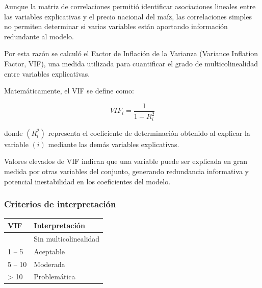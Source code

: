 \documentclass[11pt]{article}
\begin{document}
Aunque la matriz de correlaciones permitió identificar asociaciones
lineales entre las variables explicativas y el precio nacional del maíz,
las correlaciones simples no permiten determinar si varias variables
están aportando información redundante al modelo.

Por esta razón se calculó el Factor de Inflación de la Varianza
(Variance Inflation Factor, VIF), una medida utilizada para cuantificar
el grado de multicolinealidad entre variables explicativas.

Matemáticamente, el VIF se define como:

\[
VIF_i = \frac{1}{1 - R_i^2}
\]

donde \((R_i^2)\) representa el coeficiente de determinación obtenido al
explicar la variable \((i)\) mediante las demás variables explicativas.

Valores elevados de VIF indican que una variable puede ser explicada en
gran medida por otras variables del conjunto, generando redundancia
informativa y potencial inestabilidad en los coeficientes del modelo.

\hypertarget{criterios-de-interpretaciuxf3n}{%
\subsubsection{Criterios de
interpretación}\label{criterios-de-interpretaciuxf3n}}

\begin{longtable}[]{@{}ll@{}}
\toprule\noalign{}
VIF & Interpretación \\
\midrule\noalign{}
\endhead
\bottomrule\noalign{}
\endlastfoot
1 & Sin multicolinealidad \\
1 -- 5 & Aceptable \\
5 -- 10 & Moderada \\
\textgreater{} 10 & Problemática \\
\end{longtable}
\end{document}
